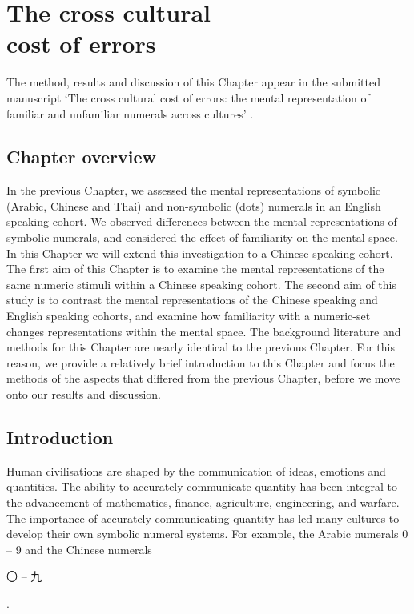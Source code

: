 \chapter{The cross cultural \\ cost of errors} 

\label{Chapter 7}

\vspace{3cm}
\newpage


\noindent
The method, results and discussion of this Chapter appear in the submitted manuscript `The cross cultural cost of errors: the mental representation of familiar and unfamiliar numerals across cultures' \cite{garrettWheel1}. 

\color{\Red}
\section{Chapter overview}
In the previous Chapter, we assessed the mental representations of symbolic (Arabic, Chinese and Thai) and non-symbolic (dots) numerals in an English speaking cohort. We observed differences between the mental representations of symbolic numerals, and considered the effect of familiarity on the mental space. In this Chapter we will extend this investigation to a Chinese speaking cohort. The first aim of this Chapter is to examine the mental representations of the same numeric stimuli within a Chinese speaking cohort. The second aim of this study is to contrast the mental representations of the Chinese speaking and English speaking cohorts, and examine how familiarity with a numeric-set changes representations within the mental space. The background literature and methods for this Chapter are nearly identical to the previous Chapter. For this reason, we provide a relatively brief introduction to this Chapter and focus the methods of the aspects that differed from the previous Chapter, before we move onto our results and discussion. 

\section{Introduction}
Human civilisations are shaped by the communication of ideas, emotions and quantities. The ability to accurately communicate quantity has been integral to the advancement of mathematics, finance, agriculture, engineering, and warfare. The importance of accurately communicating quantity has led many cultures to develop their own symbolic numeral systems. For example, the Arabic numerals 0 -- 9 and the Chinese numerals \begin{CJK}{UTF8}{gbsn} 〇 -- 九\end{CJK}. 

